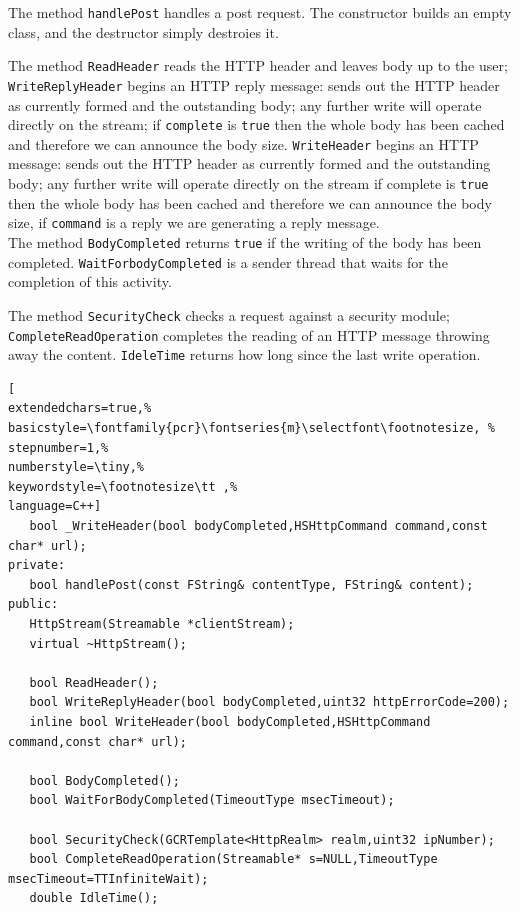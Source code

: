 The method \texttt{handlePost} handles a post request. The constructor builds an empty class, and the destructor simply destroies it.


The method \texttt{ReadHeader} reads the HTTP header and leaves body up to the user; \texttt{WriteReplyHeader} begins an HTTP reply message: sends out the HTTP header as currently formed and the outstanding body; any further write will operate directly on the stream; if \texttt{complete} is \texttt{true} then the whole body has been cached and therefore we can announce the body size. \texttt{WriteHeader} begins an HTTP message: sends out the HTTP header as currently formed and the outstanding body; any further write will operate directly on the stream if complete is \texttt{true} then the whole body has been cached and therefore we can announce the body size, if \texttt{command} is a reply we are generating a reply message.\\


The method \texttt{BodyCompleted} returns \texttt{true} if the writing of the body has been completed. \texttt{WaitForbodyCompleted} is a sender thread that waits for the completion of this activity.


The method \texttt{SecurityCheck} checks a request against a security module; \texttt{CompleteReadOperation} completes the reading of an HTTP message throwing away the content. \texttt{IdeleTime} returns how long since the last write operation.
\begin{lstlisting}[
extendedchars=true,%
basicstyle=\fontfamily{pcr}\fontseries{m}\selectfont\footnotesize, %
stepnumber=1,%
numberstyle=\tiny,%
keywordstyle=\footnotesize\tt ,%
language=C++]
   bool _WriteHeader(bool bodyCompleted,HSHttpCommand command,const char* url);
private:
   bool handlePost(const FString& contentType, FString& content);
public:
   HttpStream(Streamable *clientStream);
   virtual ~HttpStream();

   bool ReadHeader();
   bool WriteReplyHeader(bool bodyCompleted,uint32 httpErrorCode=200);
   inline bool WriteHeader(bool bodyCompleted,HSHttpCommand command,const char* url);

   bool BodyCompleted();
   bool WaitForBodyCompleted(TimeoutType msecTimeout);

   bool SecurityCheck(GCRTemplate<HttpRealm> realm,uint32 ipNumber);
   bool CompleteReadOperation(Streamable* s=NULL,TimeoutType msecTimeout=TTInfiniteWait);
   double IdleTime();
\end{lstlisting}

